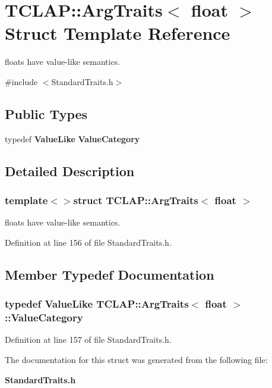 \section{T\+C\+L\+A\+P\+:\+:Arg\+Traits$<$ float $>$ Struct Template Reference}
\label{structTCLAP_1_1ArgTraits_3_01float_01_4}


floats have value-\/like semantics.  




{\ttfamily \#include $<$Standard\+Traits.\+h$>$}

\subsection*{Public Types}
\begin{DoxyCompactItemize}
\item 
typedef {\bf Value\+Like} {\bf Value\+Category}
\end{DoxyCompactItemize}


\subsection{Detailed Description}
\subsubsection*{template$<$$>$struct T\+C\+L\+A\+P\+::\+Arg\+Traits$<$ float $>$}

floats have value-\/like semantics. 

Definition at line 156 of file Standard\+Traits.\+h.



\subsection{Member Typedef Documentation}
\subsubsection[{Value\+Category}]{\setlength{\rightskip}{0pt plus 5cm}typedef {\bf Value\+Like} {\bf T\+C\+L\+A\+P\+::\+Arg\+Traits}$<$ float $>$\+::{\bf Value\+Category}}\label{structTCLAP_1_1ArgTraits_3_01float_01_4_ace983d74b1b28caa692840da15313acf}


Definition at line 157 of file Standard\+Traits.\+h.



The documentation for this struct was generated from the following file\+:\begin{DoxyCompactItemize}
\item 
{\bf Standard\+Traits.\+h}\end{DoxyCompactItemize}
